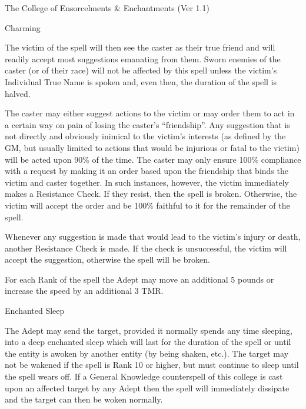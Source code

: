 \begin{Chapter}{The College of Ensorcelments \& Enchantments (Ver 1.1)}
\begin{spell}[G-1]{Charming}
\begin{effects}
The victim of the spell will then see the caster as their true friend
and will readily accept most suggestions emanating from them.  Sworn
enemies of the caster (or of their race) will not be affected by this
spell unless the victim’s Individual True Name is spoken and, even
then, the duration of the spell is halved.

The caster may either suggest actions to the victim or may order them
to act in a certain way on pain of losing the caster’s “friendship”.
Any suggestion that is not directly and obviously inimical to the
victim’s interests (as defined by the GM, but usually limited to
actions that would be injurious or fatal to the victim) will be acted
upon 90\% of the time.  The caster may only ensure 100\% compliance
with a request by making it an order based upon the friendship that
binds the victim and caster together.  In such instances, however, the
victim immediately makes a Resistance Check.  If they resist, then the
spell is broken.  Otherwise, the victim will accept the order and be
100\% faithful to it for the remainder of the spell.

Whenever any suggestion is made that would lead to the victim’s injury
or death, another Resistance Check is made.  If the check is
unsuccessful, the victim will accept the suggestion, otherwise the
spell will be broken.

For each Rank of the spell the Adept may move an additional 5 pounds
or increase the speed by an additional 3 TMR.
\end{effects}
\end{spell}

\begin{spell}[G-3]{Enchanted Sleep }

\begin{effects}
The Adept may send the target, provided it normally spends any time
sleeping, into a deep enchanted sleep which will last for the duration
of the spell or until the entity is awoken by another entity (by being
shaken, etc.).  The target may not be wakened if the spell is Rank 10
or higher, but must continue to sleep until the spell wears off. If a
General Knowledge counterspell of this college is cast upon an
affected target by any Adept then the spell will immediately dissipate
and the target can then be woken normally.
\end{effects}
\end{spell}


\end{Chapter}
